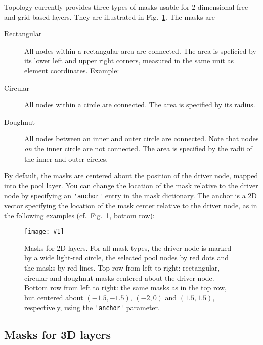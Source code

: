 \documentclass[a4paper,12pt]{report}
\newcommand{\scriptfig}[4]{%
\begin{figure}
\centerline{\texttt{[image: \#1]}}
\caption[#3]{#4}
\label{fig:#1}
\end{figure}%
}
\begin{document}
Topology currently provides three types of masks usable for 2-dimensional
free and grid-based layers. They are illustrated in Fig.~\ref{fig:conn2}.
The masks are
\begin{description}
\item[Rectangular] All nodes within a rectangular
  area are connected. The area is speficied by its lower left and
  upper right corners, measured in the same unit as element
  coordinates. Example:

\item[Circular] All nodes within a circle are
  connected.  The area is specified by its radius.

\item[Doughnut] All nodes between an inner and outer
  circle are connected. Note that nodes \emph{on} the inner circle are
  not connected. The area is specified by the radii of the inner and
  outer circles.

\end{description}
By default, the masks are centered about the position of the driver
node, mapped into the pool layer. You can change the location of the
mask relative to the driver node by specifying an
\lstinline!'anchor'! entry in the mask dictionary. The
anchor is a 2D vector specifying the location of the mask center
relative to the driver node, as in the following examples (cf.\
Fig.~\ref{fig:conn2}, bottom row):




\scriptfig{conn2}{0.9}{Masks for 2D layers}%
{Masks for 2D layers. For all mask types, the driver node is
  marked by a wide light-red circle, the selected pool nodes by red
  dots and the masks by red lines. Top row from left to right:
  rectangular, circular and doughnut masks centered about the driver
  node.
Bottom row from left to right: the same masks as in the top row, but
centered about $(-1.5,-1.5)$, $(-2,0)$ and $(1.5,1.5)$, respectively,
using the \lstinline!'anchor'! parameter.}


\subsection{Masks for 3D layers}\label{sec:3d_masks}
\end{document}
